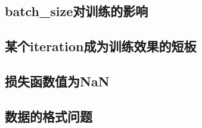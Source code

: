 \subsection{batch\_size对训练的影响}

\subsection{某个iteration成为训练效果的短板}

\subsection{损失函数值为NaN}


\subsection{数据的格式问题}
